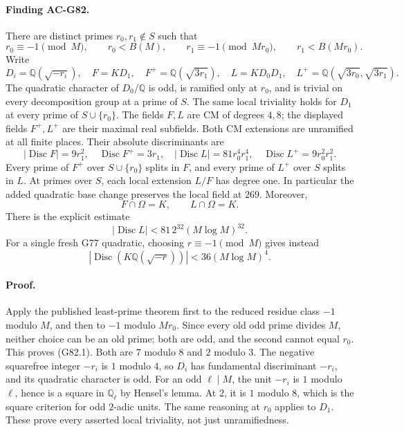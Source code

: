 \paragraph{Finding AC-G82.}
There are distinct primes \(r_0,r_1\notin S\) such that
\[
 r_0\equiv-1\pmod M,\qquad r_0<B(M),\qquad
 r_1\equiv-1\pmod{Mr_0},\qquad r_1<B(Mr_0).
 \tag{G82.1}
\]
Write
\[
 D_i=\mathbb Q(\sqrt{-r_i}),\quad
 F=KD_1,\quad F^+=\mathbb Q(\sqrt{3r_1}),\quad
 L=KD_0D_1,\quad L^+=\mathbb Q(\sqrt{3r_0},\sqrt{3r_1}).
\]
The quadratic character of \(D_0/\mathbb Q\) is odd, is ramified only at \(r_0\), and is trivial on every decomposition group at a prime of \(S\). The same local triviality holds for \(D_1\) at every prime of \(S\cup\{r_0\}\).
The fields \(F,L\) are CM of degrees \(4,8\); the displayed fields \(F^+,L^+\) are their maximal real subfields. Both CM extensions are unramified at all finite places. Their absolute discriminants are
\[
 |\operatorname{Disc}F|=9r_1^2,\quad
 \operatorname{Disc}F^+=3r_1,\quad
 |\operatorname{Disc}L|=81r_0^4r_1^4,\quad
 \operatorname{Disc}L^+=9r_0^2r_1^2.
 \tag{G82.2}
\]
Every prime of \(F^+\) over \(S\cup\{r_0\}\) splits in \(F\), and every prime of \(L^+\) over \(S\) splits in \(L\). At primes over \(S\), each local extension \(L/F\) has degree one. In particular the added quadratic base change preserves the local field at \(269\).
Moreover,
\[
 F\cap\Omega=K,\qquad L\cap\Omega=K.
 \tag{G82.3}
\]
There is the explicit estimate
\[
 |\operatorname{Disc}L|
   <81\,2^{32}(M\log M)^{32}.
 \tag{G82.4}
\]
For a single fresh G77 quadratic, choosing \(r\equiv-1\pmod M\) gives instead
\[
 |\operatorname{Disc}(K\mathbb Q(\sqrt{-r}))|
   <36(M\log M)^4.
 \tag{G82.5}
\]

\paragraph{Proof.}
Apply the published least-prime theorem first to the reduced residue class \(-1\) modulo \(M\), and then to \(-1\) modulo \(Mr_0\). Since every old odd prime divides \(M\), neither choice can be an old prime; both are odd, and the second cannot equal \(r_0\). This proves (G82.1). Both are \(7\) modulo \(8\) and \(2\) modulo \(3\).
The negative squarefree integer \(-r_i\) is \(1\) modulo \(4\), so \(D_i\) has fundamental discriminant \(-r_i\), and its quadratic character is odd. For an odd \(\ell\mid M\), the unit \(-r_i\) is \(1\) modulo \(\ell\), hence is a square in \(\mathbb Q_\ell\) by Hensel's lemma. At \(2\), it is \(1\) modulo \(8\), which is the square criterion for odd \(2\)-adic units. The same reasoning at \(r_0\) applies to \(D_1\). These prove every asserted local triviality, not just unramifiedness.

